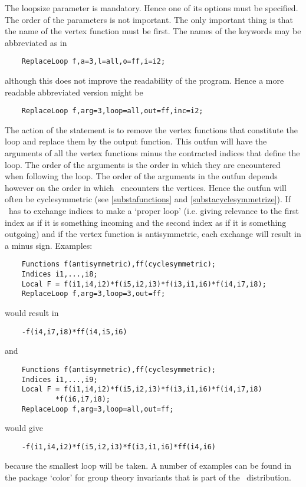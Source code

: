 
\noindent The loopsize parameter is mandatory. Hence one of 
its options must be specified. The order of the parameters is not 
important. The only important thing is that the name of the vertex function 
must be first. The names of the keywords may be abbreviated as in
\begin{verbatim}
    ReplaceLoop f,a=3,l=all,o=ff,i=i2;
\end{verbatim}
although this does not improve the readability of the program. Hence a more 
readable abbreviated version might be
\begin{verbatim}
    ReplaceLoop f,arg=3,loop=all,out=ff,inc=i2;
\end{verbatim}

\noindent The action of the statement is to remove the vertex functions 
that constitute the loop and replace them by the output function. This 
outfun will have the arguments of all the vertex functions minus the 
contracted indices that define the loop. The order of the arguments is the 
order in which they are encountered when following the loop. The order of 
the arguments in the outfun depends however on the order in which \FORM\ 
encounters the vertices. Hence the outfun will often be 
cyclesymmetric (see 
\ref{substafunctions} and \ref{substacyclesymmetrize}). If \FORM\ has to 
exchange indices to make a `proper loop' (i.e. giving relevance to the 
first index as if it is something incoming and the second index as if it is 
something outgoing) and if the vertex function is 
antisymmetric, each exchange will 
result in a minus sign. Examples:
\begin{verbatim}
    Functions f(antisymmetric),ff(cyclesymmetric);
    Indices i1,...,i8;
    Local F = f(i1,i4,i2)*f(i5,i2,i3)*f(i3,i1,i6)*f(i4,i7,i8);
    ReplaceLoop f,arg=3,loop=3,out=ff;
\end{verbatim}
would result in
\begin{verbatim}
    -f(i4,i7,i8)*ff(i4,i5,i6)
\end{verbatim}
and
\begin{verbatim}
    Functions f(antisymmetric),ff(cyclesymmetric);
    Indices i1,...,i9;
    Local F = f(i1,i4,i2)*f(i5,i2,i3)*f(i3,i1,i6)*f(i4,i7,i8)
            *f(i6,i7,i8);
    ReplaceLoop f,arg=3,loop=all,out=ff;
\end{verbatim}
would give
\begin{verbatim}
    -f(i1,i4,i2)*f(i5,i2,i3)*f(i3,i1,i6)*ff(i4,i6)
\end{verbatim}
because the smallest loop will be taken. A number of examples can be found 
in the package\index{package!color} `color'\index{color package} for group 
theory\index{group theory} invariants that is part of the \FORM\ 
distribution. 

